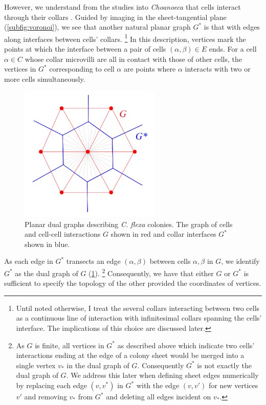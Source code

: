 However, we understand from the studies into \textit{Choanoeca} that cells interact through their collars \citep{ellis1930,leadbeater1983,brunet2019}. 
Guided by imaging in the sheet-tangential plane (\cref{subfig:voronoi}), we see that another natural planar graph $G^*$ is that with edges along interfaces between cells' collars. 
\footnote{Until noted otherwise, I treat the several collars interacting between two cells as a continuous line of interaction with infinitesimal collars spanning the cells' interface. The implications of this choice are discussed later.} 
In this description, vertices mark the points at which the interface between a pair of cells $(\alpha, \beta)\in E$ ends. 
For a cell $\alpha\in C$ whose collar microvilli are all in contact with those of other cells, the vertices in $G^*$ corresponding to cell $\alpha$ are points where $\alpha$ interacts with two or more cells simultaneously.

\begin{figure}[htbp]
    \centering
    \includegraphics[width=0.6\textwidth]{duals.png}
    \caption[Planar dual graphs describing \textit{C. flexa} colonies]{Planar dual graphs describing \textit{C. flexa} colonies. The graph of cells and cell-cell interactions $G$ shown in red and collar interfaces $G^*$ shown in blue.}
    \label{fig:duals}
\end{figure}

As each edge in $G^*$ transects an edge $(\alpha, \beta)$ between cells $\alpha, \beta$ in $G$, we identify $G^*$ as the dual graph of $G$ (\cref{fig:duals}). \footnote{As $G$ is finite, all vertices in $G^*$ as described above which indicate two cells' interactions ending at the edge of a colony sheet would be merged into a single vertex $v_*$ in the dual graph of $G$. Consequently $G^*$ is not exactly the dual graph of $G$. We address this later when defining sheet edges numerically by replacing each edge $(v, v^*)$ in $G^*$ with the edge $(v, v')$ for new vertices $v'$ and removing $v_*$ from $G^*$ and deleting all edges incident on $v_*$.}
Consequently, we have that either $G$ or $G^*$ is sufficient to specify the topology of the other provided the coordinates of vertices. 

